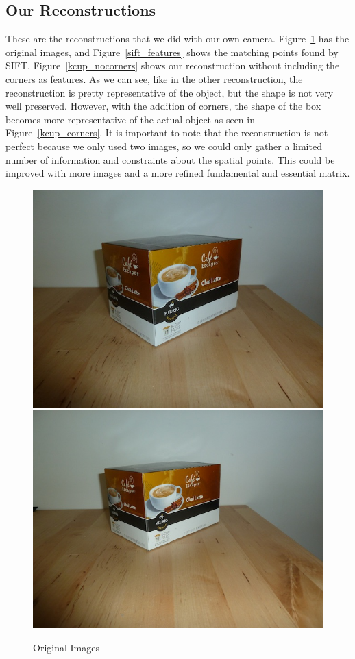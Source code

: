 \subsection{Our Reconstructions}
These are the reconstructions that we did with our own camera. Figure~\ref{original} has the original images, and Figure~\ref{sift_features} shows the matching points found by SIFT. Figure~\ref{kcup_nocorners} shows our reconstruction without including the corners as features. As we can see, like in the other reconstruction, the reconstruction is pretty representative of the object, but the shape is not very well preserved. However, with the addition of corners, the shape of the box becomes more representative of the actual object as seen in Figure~\ref{kcup_corners}. It is important to note that the reconstruction is not perfect because we only used two images, so we could only gather a limited number of information and constraints about the spatial points. This could be improved with more images and a more refined fundamental and essential matrix.

\begin{figure}[H]
\begin{center}
\includegraphics[width=0.45\linewidth]{figures/kcup1.jpg}
\includegraphics[width=0.45\linewidth]{figures/kcup2.jpg}
\end{center}
\caption{Original Images}
\label{original}
\end{figure}

